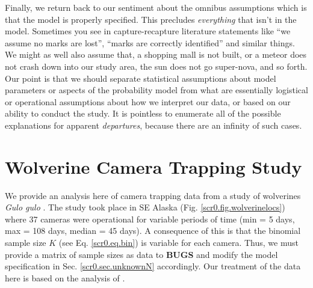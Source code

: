 

Finally, we return back to our sentiment about the omnibus assumptions
which is that the model is properly specified. This precludes {\it
  everything} that isn't in the model. Sometimes you see in
capture-recapture literature statements like ``we assume no marks are
lost'', ``marks are correctly identified'' and similar things. We
might as well also assume that, a shopping mall is not built, or a
meteor does not crash down into our study area, the sun does not go
super-nova, and so forth. Our point is that we should separate
statistical assumptions about model parameters or aspects of the
probability model from what are essentially logistical or operational
assumptions about how we interpret our data, or based on our ability
to conduct  the study.
It is pointless to enumerate all of the possible
explanations for apparent {\it departures}, because there are an
infinity of such cases.













\section{Wolverine Camera Trapping Study}
\label{scr0.sec.wolverine}

We provide an analysis here of camera trapping data from a study of
wolverines \emph{Gulo gulo}
\citep{magoun_etal:2011, royle_etal:2011jwm}. The study took place in
SE Alaska (Fig. \ref{scr0.fig.wolverinelocs}) where 37 cameras were
operational for variable periods of time (min = 5 days, max = 108
days, median = 45 days).  A consequence of this is that the binomial
sample size $K$ (see Eq. \ref{scr0.eq.bin}) is variable for each
camera. Thus, we must provide a matrix of sample sizes as data to {\bf
  BUGS} and modify the model specification in
Sec.
\ref{scr0.sec.unknownN} accordingly. Our treatment of the data
here is based on the analysis of \citet{royle_etal:2011jwm}.


